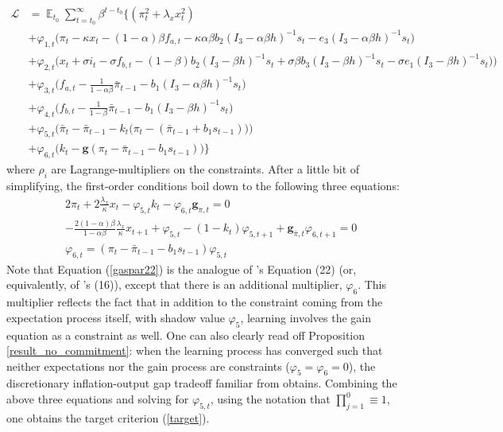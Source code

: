 \documentclass[11pt]{article}
\renewcommand{\[}{\begin{equation}}
\renewcommand{\]}{\end{equation}}
\DeclareMathOperator{\E}{\mathbb{E}}
\begin{document}
 \begin{align}
\mathcal{L} &= \E_{t_0}\sum_{t=t_0}^{\infty} \beta^{t-t_0}\bigg\{  (\pi_t^2  + \lambda_x x_t^2 )  \\
 & + \varphi_{1,t} \bigg(\pi_t - \kappa x_t -(1-\alpha)\beta f_{a,t} -\kappa\alpha\beta b_2 (I_3 - \alpha\beta h)^{-1}s_t - e_3(I_3 - \alpha\beta h)^{-1}s_t \bigg) \label{midsimple_first}\\
 & + \varphi_{2,t} \bigg(x_t + \sigma i_t -\sigma f_{b,t}  -  (1-\beta)b_2 (I_3 - \beta h)^{-1}s_t + \sigma\beta b_3 (I_3 - \beta h)^{-1}s_t -\sigma e_1(I_3 - \beta h)^{-1}s_t  \big)\bigg) \\
 & +  \varphi_{3,t}  \bigg(f_{a,t} - \frac{1}{1-\alpha\beta}\bar{\pi}_{t-1}  - b_1(I_3 - \alpha\beta h)^{-1}s_t  \bigg) \\
 & + \varphi_{4,t}  \bigg(f_{b,t} - \frac{1}{1-\beta}\bar{\pi}_{t-1}  - b_1(I_3 - \beta h)^{-1}s_t \bigg)  \\
  & + \varphi_{5,t}  \bigg(  \bar{\pi}_{t} - \bar{\pi}_{t-1} - k_t\big(\pi_{t} -(\bar{\pi}_{t-1}+b_1 s_{t-1}) \big)   \bigg)  \\
  & + \varphi_{6,t}  \bigg(k_t - \mathbf{g}(\pi_t - \bar{\pi}_{t-1}-b_1 s_{t-1})  \bigg)
  \bigg\} \label{midsimple_last}
\end{align}
where $\rho_i$ are Lagrange-multipliers on the constraints.
After a little bit of simplifying, the first-order conditions boil down to the following three equations:
\begin{align}
& 2\pi_t + 2\frac{\lambda_x}{\kappa}x_t -\varphi_{5,t} k_t - \varphi_{6,t} \mathbf{g}_{\pi,t} = 0 \label{gaspar22}\\
& -\frac{2(1-\alpha)\beta}{1-\alpha\beta}\frac{\lambda_x}{\kappa}x_{t+1} + \varphi_{5,t} -(1-k_t)\varphi_{5,t+1} +\mathbf{g}_{\bar{\pi},t}\varphi_{6,t+1} = 0 \label{gaspar21}\\
& \varphi_{6,t} = (\pi_t - \bar{\pi}_{t-1}-b_1 s_{t-1}) \varphi_{5,t} \label{constraints}
\end{align}
Note that Equation (\ref{gaspar22}) is the analogue of \cite{gaspar2010inflation}'s Equation (22) (or, equivalently, of  \cite{molnar2014optimal}'s (16)), except that there is an additional multiplier, $\varphi_6$. This multiplier reflects the fact that in addition to the constraint coming from the expectation process itself, with shadow value $\varphi_5$, learning involves the gain equation as a constraint as well. One can also clearly read off Proposition \ref{result_no_commitment}: when the learning process has converged such that neither expectations nor the gain process are constraints ($\varphi_5 =\varphi_6 = 0$), the discretionary inflation-output gap tradeoff familiar from \cite{clarida1999science} obtains. Combining the above three equations and solving for $\varphi_{5,t}$, using the notation that $\prod_{j=1}^{0} \equiv 1$, one obtains the target criterion (\ref{target}).
\end{document}
